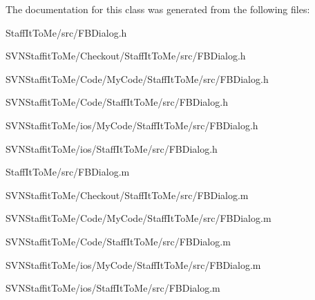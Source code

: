 \-The documentation for this class was generated from the following files\-:\begin{DoxyCompactItemize}
\item 
\-Staff\-It\-To\-Me/src/\-F\-B\-Dialog.\-h\item 
\-S\-V\-N\-Staffit\-To\-Me/\-Checkout/\-Staff\-It\-To\-Me/src/\-F\-B\-Dialog.\-h\item 
\-S\-V\-N\-Staffit\-To\-Me/\-Code/\-My\-Code/\-Staff\-It\-To\-Me/src/\-F\-B\-Dialog.\-h\item 
\-S\-V\-N\-Staffit\-To\-Me/\-Code/\-Staff\-It\-To\-Me/src/\-F\-B\-Dialog.\-h\item 
\-S\-V\-N\-Staffit\-To\-Me/ios/\-My\-Code/\-Staff\-It\-To\-Me/src/\-F\-B\-Dialog.\-h\item 
\-S\-V\-N\-Staffit\-To\-Me/ios/\-Staff\-It\-To\-Me/src/\-F\-B\-Dialog.\-h\item 
\-Staff\-It\-To\-Me/src/\-F\-B\-Dialog.\-m\item 
\-S\-V\-N\-Staffit\-To\-Me/\-Checkout/\-Staff\-It\-To\-Me/src/\-F\-B\-Dialog.\-m\item 
\-S\-V\-N\-Staffit\-To\-Me/\-Code/\-My\-Code/\-Staff\-It\-To\-Me/src/\-F\-B\-Dialog.\-m\item 
\-S\-V\-N\-Staffit\-To\-Me/\-Code/\-Staff\-It\-To\-Me/src/\-F\-B\-Dialog.\-m\item 
\-S\-V\-N\-Staffit\-To\-Me/ios/\-My\-Code/\-Staff\-It\-To\-Me/src/\-F\-B\-Dialog.\-m\item 
\-S\-V\-N\-Staffit\-To\-Me/ios/\-Staff\-It\-To\-Me/src/\-F\-B\-Dialog.\-m\end{DoxyCompactItemize}
